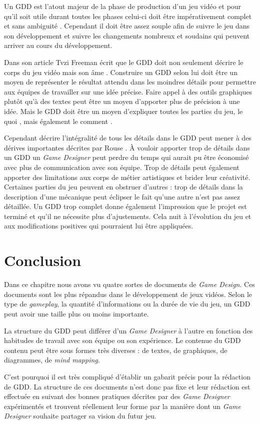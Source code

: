 Un GDD est l'atout majeur de la phase de production d'un jeu vidéo et pour qu'il soit utile durant toutes les phases celui-ci doit être impérativement complet et sans ambiguité \cite{GD_Guidelines}. Cependant il doit être assez souple afin de suivre le jeu dans son développement et suivre les changements nombreux et soudains qui peuvent arriver au cours du développement.

Dans son article  \cite{gama_greateGDD} Tvzi Freeman écrit que le GDD doit non seulement décrire le corps du jeu vidéo mais son \guillemotleft âme \guillemotright. Construire un GDD selon lui doit être un moyen de représenter le résultat attendu dans les moindres détails pour permettre aux équipes de travailler sur une idée précise. Faire appel à des outils graphiques plutôt qu'à des textes peut être un moyen d'apporter plus de précision à une idée. Mais le GDD doit être un moyen d'expliquer toutes les parties du jeu, le \guillemotleft quoi \guillemotright, mais également le \guillemotleft comment \guillemotright.

Cependant décrire l'intégralité de tous les détails dans le GDD peut mener à des dérives importantes décrites par Rouse \cite{GD_theory_rouse}. À vouloir apporter trop de détails dans un GDD un \emph{Game Designer} peut perdre du temps qui aurait pu être économisé avec plus de communication avec son équipe. Trop de détails peut également apporter des limitations aux corps de métier artistiques et brider leur créativité. Certaines parties du jeu peuvent en obstruer d'autres : trop de détails dans la description d'une mécanique peut éclipser le fait qu'une autre n'est pas assez détaillée. Un GDD trop complet donne également l'impression que le projet est terminé et qu'il ne nécessite plus d'ajustements. Cela nuit à l'évolution du jeu et aux modifications positives qui pourraient lui être appliquées.



\section{Conclusion}
Dans ce chapitre nous avons vu quatre sortes de documents de \emph{Game Design}. Ces documents sont les plus répandus dans le développement de jeux vidéos. Selon le type de \emph{gameplay}, la quantité d'informations ou la durée de vie du jeu, un GDD peut avoir une taille plus ou moins importante. 

La structure du GDD peut différer d'un \emph{Game Designer} à l'autre en fonction des habitudes de travail avec son équipe ou son expérience. Le contenue du GDD contenu peut être sous formes très diverses : de textes, de graphiques, de diagrammes, de \emph{mind mapping}. 

C'est pourquoi il est très compliqué d'établir un gabarit précis pour la rédaction de GDD. La structure de ces documents n'est donc pas fixe et leur rédaction est effectuée en suivant des bonnes pratiques décrites par des \emph{Game Designer} expérimentés et trouvent réellement leur forme par la manière dont un \emph{Game Designer} souhaite partager sa vision du futur jeu.

